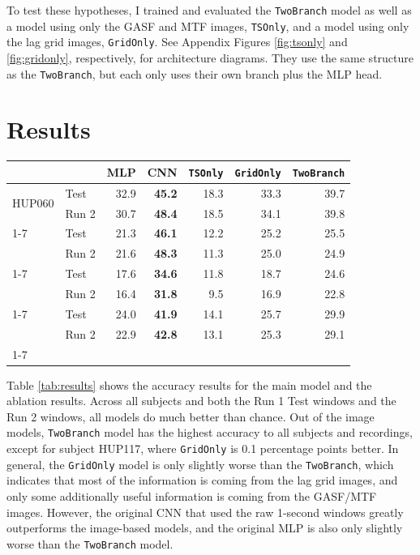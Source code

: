 \documentclass{article}
\begin{document}
To test these hypotheses, I trained and evaluated the \texttt{TwoBranch} model as well as a model using only the GASF and MTF images, \texttt{TSOnly}, and a model using only the lag grid images, \texttt{GridOnly}. See Appendix Figures \ref{fig:tsonly} and \ref{fig:gridonly}, respectively, for architecture diagrams. They use the same structure as the \texttt{TwoBranch}, but each only uses their own branch plus the MLP head.

\section{Results}
\begin{center}
\label{tab:results}
\begin{tabular}{llrrrrr}
\toprule
 &  & MLP & CNN & \texttt{TSOnly} & \texttt{GridOnly} & \texttt{TwoBranch} \\
\midrule
\multirow[c]{2}{*}{HUP060} & Test & 32.9 & \bfseries 45.2 & 18.3 & 33.3 & 39.7 \\
 & Run 2 & 30.7 & \bfseries 48.4 & 18.5 & 34.1 & 39.8 \\
\cline{1-7}
\multirow[c]{2}{*}{HUP117} & Test & 21.3 & \bfseries 46.1 & 12.2 & 25.2 & 25.5 \\
 & Run 2 & 21.6 & \bfseries 48.3 & 11.3 & 25.0 & 24.9 \\
\cline{1-7}
\multirow[c]{2}{*}{HUP133} & Test & 17.6 & \bfseries 34.6 & 11.8 & 18.7 & 24.6 \\
 & Run 2 & 16.4 & \bfseries 31.8 & 9.5 & 16.9 & 22.8 \\
\cline{1-7}
\multirow[c]{2}{*}{Mean} & Test & 24.0 & \bfseries 41.9 & 14.1 & 25.7 & 29.9 \\
 & Run 2 & 22.9 & \bfseries 42.8 & 13.1 & 25.3 & 29.1 \\
\cline{1-7}
\bottomrule
\end{tabular}
\end{center}

Table \ref{tab:results} shows the accuracy results for the main model and the ablation results. Across all subjects and both the Run 1 Test windows and the Run 2 windows, all models do much better than chance. Out of the image models, \texttt{TwoBranch} model has the highest accuracy to all subjects and recordings, except for subject HUP117, where \texttt{GridOnly} is 0.1 percentage points better. In general, the \texttt{GridOnly} model is only slightly worse than the \texttt{TwoBranch}, which indicates that most of the information is coming from the lag grid images, and only some additionally useful information is coming from the GASF/MTF images. However, the original CNN that used the raw 1-second windows greatly outperforms the image-based models, and the original MLP is also only slightly worse than the \texttt{TwoBranch} model.
\end{document}
